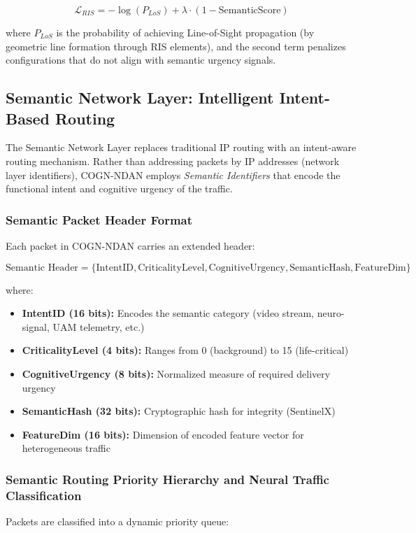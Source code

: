 \documentclass[journal]{IEEEtran}
\newcommand{\COGN}{COGN-NDAN}
\begin{document}
\begin{equation}
    \mathcal{L}_{RIS} = -\log(P_{LoS}) + \lambda \cdot (1 - \text{SemanticScore})
\end{equation}

where $P_{LoS}$ is the probability of achieving Line-of-Sight propagation (by geometric line formation through RIS elements), and the second term penalizes configurations that do not align with semantic urgency signals.

\subsection{Semantic Network Layer: Intelligent Intent-Based Routing}

The Semantic Network Layer replaces traditional IP routing with an intent-aware routing mechanism. Rather than addressing packets by IP addresses (network layer identifiers), \COGN{} employs \textit{Semantic Identifiers} that encode the functional intent and cognitive urgency of the traffic.

\subsubsection{Semantic Packet Header Format}
Each packet in \COGN{} carries an extended header:

\begin{equation}
    \text{Semantic Header} = \{\text{IntentID}, \text{CriticalityLevel}, \text{CognitiveUrgency}, \text{SemanticHash}, \text{FeatureDim}\}
\end{equation}

where:
\begin{itemize}
    \item \textbf{IntentID (16 bits):} Encodes the semantic category (video stream, neuro-signal, UAM telemetry, etc.)
    \item \textbf{CriticalityLevel (4 bits):} Ranges from 0 (background) to 15 (life-critical)
    \item \textbf{CognitiveUrgency (8 bits):} Normalized measure of required delivery urgency
    \item \textbf{SemanticHash (32 bits):} Cryptographic hash for integrity (SentinelX)
    \item \textbf{FeatureDim (16 bits):} Dimension of encoded feature vector for heterogeneous traffic
\end{itemize}

\subsubsection{Semantic Routing Priority Hierarchy and Neural Traffic Classification}
Packets are classified into a dynamic priority queue:
\end{document}
